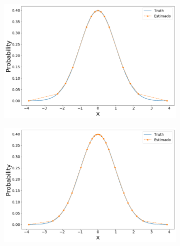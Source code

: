 \begin{figure}[H]
	\centering
	\begin{subfigure}[b]{0.45\textwidth}
		\centering 
		\includegraphics[width=\linewidth]{./figuras/iPDF2_normal_15}
		\caption{}
		\label{fig:ipdf2norm15}
	\end{subfigure}
	\hfill
	\begin{subfigure}[b]{0.45\textwidth}
		\centering 
		\includegraphics[width=\linewidth]{./figuras/iPDF2_normal_25}
		\caption{}
		\label{fig:ipdf2norm25}
	\end{subfigure}


\end{figure}
